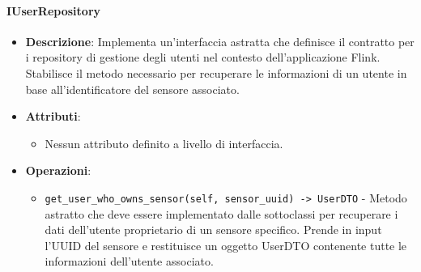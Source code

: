 \documentclass[10pt]{article}
\begin{document}
    \paragraph{IUserRepository}
    \begin{itemize} 
    \item \textbf{Descrizione}: Implementa un'interfaccia astratta che definisce il contratto per i repository di gestione degli utenti nel contesto dell'applicazione Flink. Stabilisce il metodo necessario per recuperare le informazioni di un utente in base all'identificatore del sensore associato.
    \item \textbf{Attributi}:
    \begin{itemize}
        \item Nessun attributo definito a livello di interfaccia.
    \end{itemize}
    
    \item \textbf{Operazioni}:
    \begin{itemize}
        \item \texttt{get\_user\_who\_owns\_sensor(self, sensor\_uuid) -> UserDTO} - Metodo astratto che deve essere implementato dalle sottoclassi per recuperare i dati dell'utente proprietario di un sensore specifico. Prende in input l'UUID del sensore e restituisce un oggetto UserDTO contenente tutte le informazioni dell'utente associato.
    \end{itemize}
    \end{itemize}
\end{document}
